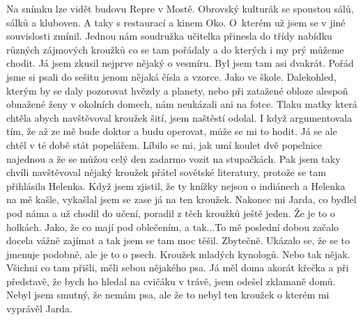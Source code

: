 

Na snímku lze vidět budovu Repre v Mostě. Obrovský kulturák se
spoustou sálů, sálků a kluboven. A taky s restaurací a kinem Oko.
O~kterém už jsem se v jiné souvislosti zmínil. Jednou nám soudružka
učitelka přinesla do třídy nabídku různých zájmových kroužků co se tam
pořádaly a do kterých i my prý můžeme chodit. Já jsem zkusil nejprve
nějaký o vesmíru. Byl jsem tam asi dvakrát. Pořád jsme si psali do
sešitu jenom nějaká čísla a vzorce. Jako ve škole. Dalekohled, kterým
by se daly pozorovat hvězdy a planety, nebo při zatažené obloze
alespoň obnažené ženy v okolních domech, nám neukázali ani na fotce.
Tlaku matky která chtěla abych navštěvoval kroužek šití, jsem naštěstí
odolal. I když argumentovala tím, že až ze mě bude doktor a budu
operovat, může se mi to hodit. Já se ale chtěl v té době stát
popelářem. Líbilo se mi, jak umí koulet dvě popelnice najednou a že se
můžou celý den zadarmo vozit na stupačkách. Pak jsem taky chvíli
navštěvoval nějaký kroužek přátel sovětské literatury, protože se tam
přihlásila Helenka. Když jsem zjistil, že ty knížky nejsou o indiánech
a Helenka na mě kašle, vykašlal jsem se zase já na ten kroužek.
Nakonec mi Jarda, co bydlel pod náma a už chodil do učení, poradil z
těch kroužků ještě jeden. Že je to o holkách. Jako, že co mají pod
oblečením, a tak...To mě poslední dobou začalo docela vážně zajímat a
tak jsem se tam moc těšil. Zbytečně. Ukázalo se, že se to jmenuje
podobně, ale je to o psech. Kroužek mladých kynologů. Nebo tak nějak.
Všichni co tam přišli, měli sebou nějakého psa. Já měl doma akorát
křečka a při představě, že bych ho hledal na cvičáku v trávě, jsem
odešel zklamaně domů. Nebyl jsem smutný, že nemám psa, ale že to nebyl
ten kroužek o kterém mi vyprávěl Jarda.
